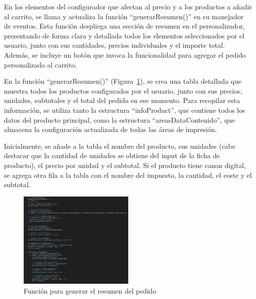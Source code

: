 \documentclass[11pt]{article}
\begin{document}
En los elementos del configurador que afectan al precio y a los productos a añadir al carrito, se llama y actualiza la función ``generarResumen()'' 
en su manejador de eventos. Esta función despliega una sección de resumen en el personalizador, presentando de forma clara y detallada todos 
los elementos seleccionados por el usuario, junto con sus cantidades, precios individuales y el importe total. Además, 
se incluye un botón que invoca la funcionalidad para agregar el pedido personalizado al carrito.


En la función ``generarResumen()'' (Figura~\ref{fig:resumen1}), se crea una tabla detallada que muestra todos los productos configurados por el usuario, junto con sus precios,
unidades, subtotales y el total del pedido en ese momento. Para recopilar esta información, se utiliza tanto la estructura ``infoProduct'', 
que contiene todos los datos del producto principal, como la estructura ``areasDataContenido'', que almacena la configuración actualizada 
de todas las áreas de impresión.

Inicialmente, se añade a la tabla el nombre del producto, sus unidades (cabe destacar que la cantidad de unidades se obtiene del input de 
la ficha de producto), el precio por unidad y el subtotal. Si el producto tiene canon digital, 
se agrega otra fila a la tabla con el nombre del impuesto, la cantidad, el coste y el subtotal.

\begin{figure}[H]
    \centering
    \includegraphics[width=0.5\textwidth]{imagenesUS3-modal/generarResumen.png}
    \caption{\label{fig:resumen1} Función para generar el resumen del pedido}
    \vspace{\fill}
\end{figure}
\end{document}
